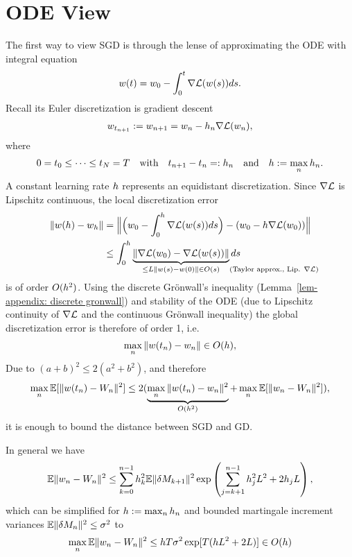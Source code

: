 \section{ODE View}

The first way to view SGD is through the lense of approximating the ODE with
integral equation
\begin{align*}
	w(t) =  w_0 -\int_{0}^{t}\nabla\mathcal{L}(w(s))ds.
\end{align*}
Recall its Euler discretization is gradient descent 
\begin{align*}
	w_{t_{n+1}}:=w_{n+1}
	= w_n - h_n \nabla\mathcal{L}(w_n),
\end{align*}
where
\begin{align*}
	0=t_0 \le \dots \le t_N= T \quad \text{with} \quad t_{n+1}-t_n=:h_n
	\quad \text{and}\quad h:=\max_n h_n.
\end{align*}
A constant learning rate \(h\) represents an equidistant discretization.
Since \(\nabla\mathcal{L}\) is Lipschitz continuous, the local discretization error
\begin{align*}
	\|\weights(\lr)  - \weights_\lr \|
	&= \Big\|
		\Big(\weights_0 - \int_0^\lr\nabla\Loss(\weights(s))ds\Big)
		- (\weights_0-\lr\nabla\Loss(\weights_0))
	\Big\|\\
	&\le \int_0^\lr \underbrace{\|\nabla\Loss(\weights_0) - \nabla\Loss(\weights(s))\|}_{
		\le \ubound \|\weights(s) - \weights(0)\| \in O(s) \mathrlap{\quad\text{(Taylor approx., Lip. \(\nabla\Loss\))}}
	}ds 
\end{align*}
is of order \(O(h^2)\). 
Using the discrete Gr\"onwall's inequality (Lemma~\ref{lem-appendix: discrete
gronwall}) and stability of the ODE (due to Lipschitz continuity of
\(\nabla\mathcal{L}\) and the continuous Gr\"onwall inequality) the global
discretization error is therefore of order 1, i.e.\ 
\begin{align*}
	\max_{n} \|w(t_n) - w_n\| \in O(h),
\end{align*}
Due to \((a+b)^2\le2(a^2+b^2)\), and therefore 
\begin{align*}
	\max_n\mathbb{E}[\|w(t_n)-W_n\|^2]
	\le 2(\underbrace{\max_n \|w(t_n)-w_n\|^2}_{O(h^2)}
	+\max_{n}\mathbb{E}[\|w_n - W_n\|^2]),
\end{align*}
it is enough to bound the distance between SGD and GD.
\begin{theorem}\label{thm: distance SGD vs GD}
	In general we have
	\begin{align*}
		\mathbb{E}\|w_n-W_n\|^2
		\le \sum_{k=0}^{n-1}h_k^2\mathbb{E}\|\delta M_{k+1}\|^2\exp\left(
			\sum_{j=k+1}^{n-1}h_j^2L^2 + 2h_jL
		\right),
	\end{align*}
	which can be simplified for \(h:=\max_nh_n\) and bounded martingale
	increment variances \(\mathbb{E}\|\delta M_n\|^2 \le \sigma^2\) to
	\begin{align*}
		\max_{n}\mathbb{E}\|w_n	-W_n\|^2
		\le h T\sigma^2\exp[T(hL^2 + 2L)] \in O(h)
	\end{align*}
\end{theorem}
